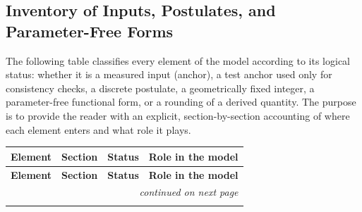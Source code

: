 \documentclass[10pt,a4paper]{article}
\begin{document}
\subsection{Inventory of Inputs, Postulates, and Parameter-Free Forms}
\label{app:inventory_status}

The following table classifies every element of the model according to
its logical status: whether it is a measured input (anchor), a test
anchor used only for consistency checks, a discrete postulate, a
geometrically fixed integer, a parameter-free functional form, or a
rounding of a derived quantity. The purpose is to provide the reader
with an explicit, section-by-section accounting of where each element
enters and what role it plays.

{\small
	\begin{longtable}{@{}p{3.2cm}p{1.8cm}p{2.6cm}p{6.0cm}@{}}
		\toprule
		\textbf{Element} & \textbf{Section} & \textbf{Status} & \textbf{Role in the model} \\
		\midrule
		\endfirsthead
		\toprule
		\textbf{Element} & \textbf{Section} & \textbf{Status} & \textbf{Role in the model} \\
		\midrule
		\endhead
		
		\midrule
		\multicolumn{4}{r}{\small\textit{continued on next page}} \\
		\endfoot
		

\end{longtable}}
\end{document}
